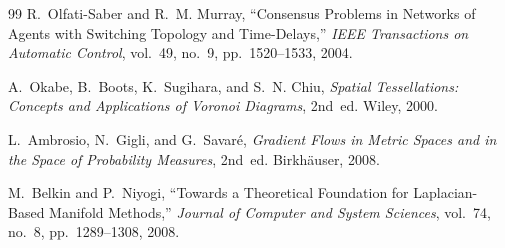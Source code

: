\documentclass[11pt,fleqn]{book}
\numberwithin{equation}{chapter}
\theoremstyle{plain}
\theoremstyle{definition}
\theoremstyle{remark}
\begin{document}
\begin{thebibliography}{99}
R.~Olfati-Saber and R.~M. Murray, ``Consensus Problems in Networks of Agents with Switching Topology and Time-Delays,'' \emph{IEEE Transactions on Automatic Control}, vol.~49, no.~9, pp.~1520--1533, 2004.

A.~Okabe, B.~Boots, K.~Sugihara, and S.~N. Chiu, \emph{Spatial Tessellations: Concepts and Applications of Voronoi Diagrams}, 2nd~ed. Wiley, 2000.

L.~Ambrosio, N.~Gigli, and G.~Savaré, \emph{Gradient Flows in Metric Spaces and in the Space of Probability Measures}, 2nd~ed. Birkhäuser, 2008.

M.~Belkin and P.~Niyogi, ``Towards a Theoretical Foundation for Laplacian-Based Manifold Methods,'' \emph{Journal of Computer and System Sciences}, vol.~74, no.~8, pp.~1289--1308, 2008.

\end{thebibliography}
\end{document}
